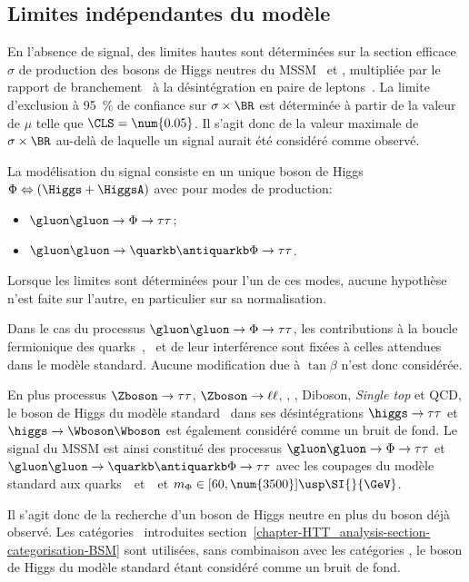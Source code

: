 \subsection{Limites indépendantes du modèle}\label{chapter-HTT_analysis-section-signal_extraction-model_indep_and_likelihood}
En l'absence de signal, des limites hautes sont déterminées sur la section efficace $\sigma$ de production des bosons de Higgs neutres du MSSM \Higgs\ et \HiggsA, multipliée par le rapport de branchement \BR\ à la désintégration en paire de leptons~\tau.
La limite d'exclusion à \SI{95}{\%} de confiance sur $\sigma\times\BR$ est déterminée à partir de la valeur de $\mu$ telle que $\CLS = \num{0.05}$.
Il s'agit donc de la valeur maximale de $\sigma\times\BR$ au-delà de laquelle un signal aurait été considéré comme observé.
\par
La modélisation du signal consiste en un unique boson de Higgs $\Phi \Leftrightarrow (\Higgs + \HiggsA)$ avec pour modes de production:
\begin{itemize}
\item $\gluon\gluon\to\Phi\to\tau\tau$;
\item $\gluon\gluon\to\quarkb\antiquarkb\Phi\to\tau\tau$.
\end{itemize}
Lorsque les limites sont déterminées pour l'un de ces modes, aucune hypothèse n'est faite sur l'autre, en particulier sur sa normalisation.
\par
Dans le cas du processus $\gluon\gluon\to\Phi\to\tau\tau$, les contributions à la boucle fermionique des quarks~\quarkt, \quarkb\ et de leur interférence sont fixées à celles attendues dans le modèle standard.
Aucune modification due à $\tan\beta$ n'est donc considérée.
\par
En plus processus
$\Zboson\to\tau\tau$,
$\Zboson\to\ell\ell$,
\Wjets,
\ttbar,
Diboson, \emph{Single top}
et
QCD,
le boson de Higgs du modèle standard \higgs\ dans ses désintégrations
$\higgs\to\tau\tau$
et
$\higgs\to\Wboson\Wboson$
est également considéré comme un bruit de fond.
Le signal du MSSM est ainsi constitué des processus
$\gluon\gluon\to\Phi\to\tau\tau$
et
$\gluon\gluon\to\quarkb\antiquarkb\Phi\to\tau\tau$
avec les coupages du modèle standard aux quarks~\quarkt\ et~\quarkb\
et $m_\Phi\in[60, \num{3500}]\usp\SI{}{\GeV}$.
\par
Il s'agit donc de la recherche d'un boson de Higgs neutre en plus du boson déjà observé.
Les catégories \CATbsm\ introduites section~\ref{chapter-HTT_analysis-section-categorisation-BSM} sont utilisées, sans combinaison avec les catégories \CATsm, le boson de Higgs du modèle standard étant considéré comme un bruit de fond.